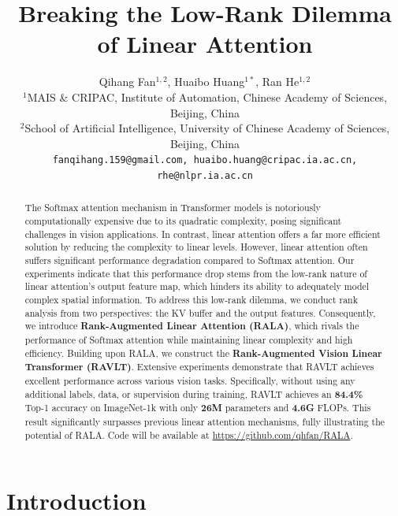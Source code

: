 \documentclass[10pt,twocolumn,letterpaper]{article}
\begin{document}
\title{Breaking the Low-Rank Dilemma of Linear Attention}

\author{Qihang Fan$^{1,2}$, Huaibo Huang$^{1*}$, Ran He$^{1,2}$ \\
$^1$MAIS \& CRIPAC, Institute of Automation, Chinese Academy of Sciences, Beijing, China \\
$^2$School of Artificial Intelligence, University of Chinese Academy of Sciences, Beijing, China \\
{\tt\small fanqihang.159@gmail.com, huaibo.huang@cripac.ia.ac.cn, rhe@nlpr.ia.ac.cn}
}

\maketitle

\begin{abstract}
The Softmax attention mechanism in Transformer models is notoriously computationally expensive due to its quadratic complexity, posing significant challenges in vision applications. In contrast, linear attention offers a far more efficient solution by reducing the complexity to linear levels. However, linear attention often suffers significant performance degradation compared to Softmax attention. Our experiments indicate that this performance drop stems from the low-rank nature of linear attention's output feature map, which hinders its ability to adequately model complex spatial information. To address this low-rank dilemma, we conduct rank analysis from two perspectives: the KV buffer and the output features. Consequently, we introduce \textbf{Rank-Augmented Linear Attention (RALA)}, which rivals the performance of Softmax attention while maintaining linear complexity and high efficiency. Building upon RALA, we construct the \textbf{Rank-Augmented Vision Linear Transformer (RAVLT)}. Extensive experiments demonstrate that RAVLT achieves excellent performance across various vision tasks. Specifically, without using any additional labels, data, or supervision during training, RAVLT achieves an \textbf{84.4\%} Top-1 accuracy on ImageNet-1k with only \textbf{26M} parameters and \textbf{4.6G} FLOPs. This result significantly surpasses previous linear attention mechanisms, fully illustrating the potential of RALA. Code will be available at \url{https://github.com/qhfan/RALA}.
\end{abstract}

\section{Introduction}
\end{document}

